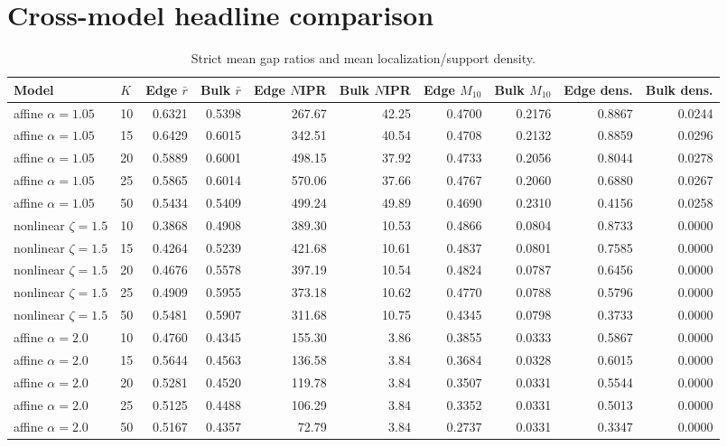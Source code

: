 \documentclass[10pt,letterpaper]{article}
\newcommand{\Hdr}[1]{\cellcolor{navy}\color{white}\bfseries #1}
\begin{document}
\section{Cross-model headline comparison}
\begin{table}[H]\centering\scriptsize{}\begin{tabular}{|l|l|r|r|r|r|r|r|r|r|}\hline
\Hdr{Model} & \Hdr{$K$} & \Hdr{Edge $\bar r$} & \Hdr{Bulk $\bar r$} & \Hdr{Edge $N$IPR} & \Hdr{Bulk $N$IPR} & \Hdr{Edge $M_{10}$} & \Hdr{Bulk $M_{10}$} & \Hdr{Edge dens.} & \Hdr{Bulk dens.}\\\hline
affine $\alpha=1.05$ & 10 & 0.6321 & 0.5398 & 267.67 & 42.25 & 0.4700 & 0.2176 & 0.8867 & 0.0244 \\\hline
affine $\alpha=1.05$ & 15 & 0.6429 & 0.6015 & 342.51 & 40.54 & 0.4708 & 0.2132 & 0.8859 & 0.0296 \\\hline
affine $\alpha=1.05$ & 20 & 0.5889 & 0.6001 & 498.15 & 37.92 & 0.4733 & 0.2056 & 0.8044 & 0.0278 \\\hline
affine $\alpha=1.05$ & 25 & 0.5865 & 0.6014 & 570.06 & 37.66 & 0.4767 & 0.2060 & 0.6880 & 0.0267 \\\hline
affine $\alpha=1.05$ & 50 & 0.5434 & 0.5409 & 499.24 & 49.89 & 0.4690 & 0.2310 & 0.4156 & 0.0258 \\\hline
nonlinear $\zeta=1.5$ & 10 & 0.3868 & 0.4908 & 389.30 & 10.53 & 0.4866 & 0.0804 & 0.8733 & 0.0000 \\\hline
nonlinear $\zeta=1.5$ & 15 & 0.4264 & 0.5239 & 421.68 & 10.61 & 0.4837 & 0.0801 & 0.7585 & 0.0000 \\\hline
nonlinear $\zeta=1.5$ & 20 & 0.4676 & 0.5578 & 397.19 & 10.54 & 0.4824 & 0.0787 & 0.6456 & 0.0000 \\\hline
nonlinear $\zeta=1.5$ & 25 & 0.4909 & 0.5955 & 373.18 & 10.62 & 0.4770 & 0.0788 & 0.5796 & 0.0000 \\\hline
nonlinear $\zeta=1.5$ & 50 & 0.5481 & 0.5907 & 311.68 & 10.75 & 0.4345 & 0.0798 & 0.3733 & 0.0000 \\\hline
affine $\alpha=2.0$ & 10 & 0.4760 & 0.4345 & 155.30 & 3.86 & 0.3855 & 0.0333 & 0.5867 & 0.0000 \\\hline
affine $\alpha=2.0$ & 15 & 0.5644 & 0.4563 & 136.58 & 3.84 & 0.3684 & 0.0328 & 0.6015 & 0.0000 \\\hline
affine $\alpha=2.0$ & 20 & 0.5281 & 0.4520 & 119.78 & 3.84 & 0.3507 & 0.0331 & 0.5544 & 0.0000 \\\hline
affine $\alpha=2.0$ & 25 & 0.5125 & 0.4488 & 106.29 & 3.84 & 0.3352 & 0.0331 & 0.5013 & 0.0000 \\\hline
affine $\alpha=2.0$ & 50 & 0.5167 & 0.4357 & 72.79 & 3.84 & 0.2737 & 0.0331 & 0.3347 & 0.0000 \\\hline
\hline\end{tabular}\caption{Strict mean gap ratios and mean localization/support density.}\end{table}
\end{document}
